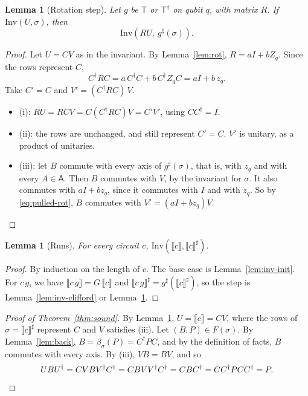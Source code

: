 \documentclass[11pt]{article}
\newtheorem{lemma}[theorem]{Lemma}
\theoremstyle{definition}
\theoremstyle{remark}
\newcommand{\sem}[1]{\llbracket #1 \rrbracket}
\newcommand{\abs}[1]{\llbracket #1 \rrbracket^{\sharp}}
\newcommand{\adj}{^{\dagger}}
\newcommand{\Ax}{\mathsf{A}}
\newcommand{\back}{\beta}
\newcommand{\gate}[1]{\mathsf{#1}}
\begin{document}
\begin{lemma}[Rotation step]\label{lem:inv-rot}
Let $g$ be $\gate T$ or $\gate T\adj$ on qubit $q$, with matrix $R$. If
$\mathrm{Inv}(U, \sigma)$, then
\[
  \mathrm{Inv}(R U,\ g^\sharp(\sigma)).
\]
\end{lemma}

\begin{proof}
Let $U = CV$ as in the invariant. By Lemma~\ref{lem:rot}, $R = aI + bZ_q$. Since the rows
represent $C$,
\begin{equation}\label{eq:pulled-rot}
  C\adj R C = a\, C\adj C + b\, C\adj Z_q C = a I + b\, z_q .
\end{equation}
Take $C' = C$ and $V' = (C\adj R C)\, V$.
\begin{itemize}[nosep]
  \item (i): $R U = R C V = C (C\adj R C) V = C' V'$, using $C C\adj = I$.
  \item (ii): the rows are unchanged, and still represent $C' = C$. $V'$ is unitary, as a
  product of unitaries.
  \item (iii): let $B$ commute with every axis of $g^\sharp(\sigma)$, that is, with $z_q$ and
  with every $A \in \Ax$. Then $B$ commutes with $V$, by the invariant for $\sigma$. It also
  commutes with $aI + b z_q$, since it commutes with $I$ and with $z_q$. So by
  \eqref{eq:pulled-rot}, $B$ commutes with $V' = (aI + bz_q) V$.\qedhere
\end{itemize}
\end{proof}

\begin{lemma}[Runs]\label{lem:inv-run}
For every circuit $c$, $\mathrm{Inv}(\sem{c}, \abs{c})$.
\end{lemma}

\begin{proof}
By induction on the length of $c$. The base case is Lemma~\ref{lem:inv-init}. For
$c\,g$, we have $\sem{c\,g} = G\,\sem{c}$ and $\abs{c\,g} = g^\sharp(\abs{c})$, so the step
is Lemma~\ref{lem:inv-clifford} or Lemma~\ref{lem:inv-rot}.
\end{proof}

\begin{proof}[Proof of Theorem~\ref{thm:sound}]
By Lemma~\ref{lem:inv-run}, $U = \sem{c} = C V$, where the rows of $\sigma = \abs{c}$
represent $C$ and $V$ satisfies (iii). Let $(B, P) \in F(\sigma)$. By Lemma~\ref{lem:back},
$B = \back_\sigma(P) = C\adj P C$, and by the definition of facts, $B$ commutes with every
axis. By (iii), $VB = BV$, and so
\[
  U B U\adj = C V B V\adj C\adj = C B V V\adj C\adj = C B C\adj
            = C C\adj P C C\adj = P . \qedhere
\]
\end{proof}
\end{document}
